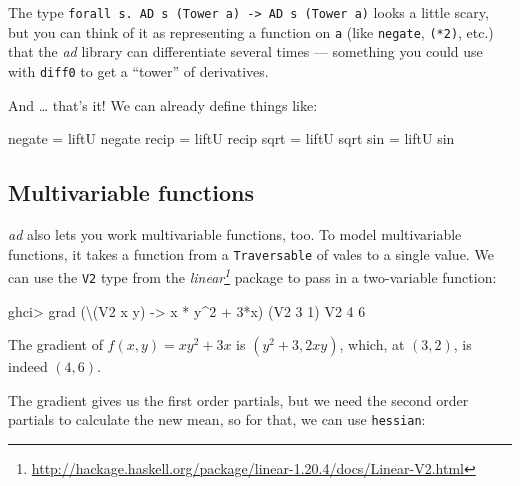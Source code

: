 \documentclass[]{article}
\newenvironment{Shaded}{}{}
\newcommand{\DataTypeTok}[1]{\textcolor[rgb]{0.56,0.13,0.00}{{#1}}}
\newcommand{\DecValTok}[1]{\textcolor[rgb]{0.25,0.63,0.44}{{#1}}}
\newcommand{\OtherTok}[1]{\textcolor[rgb]{0.00,0.44,0.13}{{#1}}}
\newcommand{\FunctionTok}[1]{\textcolor[rgb]{0.02,0.16,0.49}{{#1}}}
\newcommand{\NormalTok}[1]{{#1}}
\renewcommand{\href}[2]{#2\footnote{\url{#1}}}
\begin{document}
The type
\texttt{forall\ s.\ AD\ s\ (Tower\ a)\ -\textgreater{}\ AD\ s\ (Tower\ a)}
looks a little scary, but you can think of it as representing a function
on \texttt{a} (like \texttt{negate}, \texttt{(*2)}, etc.) that the
\emph{ad} library can differentiate several times --- something you
could use with \texttt{diff0} to get a ``tower'' of derivatives.

And \ldots{} that's it! We can already define things like:

\begin{Shaded}
\begin{Highlighting}[]
\NormalTok{negate }\FunctionTok{=} \NormalTok{liftU negate}
\NormalTok{recip  }\FunctionTok{=} \NormalTok{liftU recip}
\NormalTok{sqrt   }\FunctionTok{=} \NormalTok{liftU sqrt}
\NormalTok{sin    }\FunctionTok{=} \NormalTok{liftU sin}
\end{Highlighting}
\end{Shaded}

\subsection{Multivariable functions}\label{multivariable-functions}

\emph{ad} also lets you work multivariable functions, too. To model
multivariable functions, it takes a function from a \texttt{Traversable}
of vales to a single value. We can use the \texttt{V2} type from the
\emph{\href{http://hackage.haskell.org/package/linear-1.20.4/docs/Linear-V2.html}{linear}}
package to pass in a two-variable function:

\begin{Shaded}
\begin{Highlighting}[]
\NormalTok{ghci}\FunctionTok{>} \NormalTok{grad (\textbackslash{}(}\DataTypeTok{V2} \NormalTok{x y) }\OtherTok{->} \NormalTok{x }\FunctionTok{*} \NormalTok{y}\FunctionTok{^}\DecValTok{2} \FunctionTok{+} \DecValTok{3}\FunctionTok{*}\NormalTok{x) (}\DataTypeTok{V2} \DecValTok{3} \DecValTok{1}\NormalTok{)}
\DataTypeTok{V2} \DecValTok{4} \DecValTok{6}
\end{Highlighting}
\end{Shaded}

The gradient of \(f(x, y) = x y^2 + 3x\) is \((y^2 + 3, 2xy)\), which,
at \((3, 2)\), is indeed \((4, 6)\).

The gradient gives us the first order partials, but we need the second
order partials to calculate the new mean, so for that, we can use
\texttt{hessian}:
\end{document}
